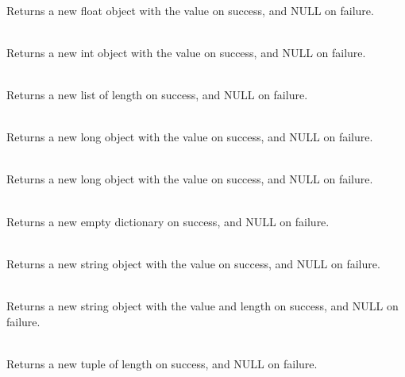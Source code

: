      \\
	 Returns a new float object with the value  on success, and
	 NULL on failure.
     
     \\
	 Returns a new int object with the value  on success, and
	 NULL on failure.

     \\
	 Returns a new list of length  on success, and NULL on
	 failure.

     \\
	 Returns a new long object with the value  on success, and
	 NULL on failure.

     \\
	 Returns a new long object with the value  on success, and
	 NULL on failure.

     \\
	 Returns a new empty dictionary on success, and NULL on
	 failure.

     \\
	 Returns a new string object with the value  on success, and
	 NULL on failure.

     \\
	 Returns a new string object with the value  and length 
	 on success, and NULL on failure.

     \\
	 Returns a new tuple of length  on success, and NULL on
	 failure.

